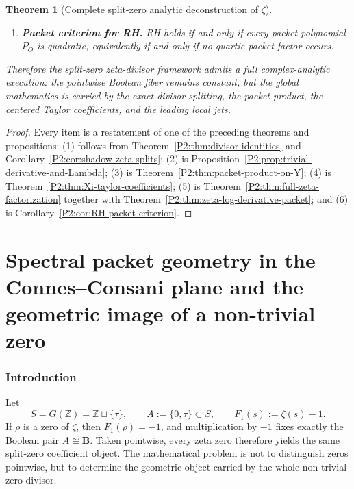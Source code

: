 \documentclass[11pt,a4paper]{article}
\numberwithin{equation}{section}
\newtheorem{theorem}{Theorem}[section]
\theoremstyle{definition}
\theoremstyle{remark}
\newcommand{\ZZ}{\mathbb Z}
\newcommand{\BB}{\mathbf B}
\newcommand{\taup}{\tau}
\newcommand{\setpartprefix}[1]{\def\partprefix{#1}\setcounter{section}{0}}
\def\partprefix{0}
\begin{document}
\begin{theorem}[Complete split-zero analytic deconstruction of $\zeta$]
\begin{enumerate}[label=(\arabic*)]
\item \textbf{Packet criterion for RH.}
RH holds if and only if every packet polynomial $P_O$ is quadratic, equivalently if and only if no quartic packet factor occurs.
\end{enumerate}

Therefore the split-zero zeta-divisor framework admits a full complex-analytic execution: the pointwise Boolean fiber remains constant, but the global mathematics is carried by the exact divisor splitting, the packet product, the centered Taylor coefficients, and the leading local jets.
\end{theorem}

\begin{proof}
Every item is a restatement of one of the preceding theorems and propositions:
(1) follows from Theorem~\ref{P2:thm:divisor-identities} and Corollary~\ref{P2:cor:shadow-zeta-splits};
(2) is Proposition~\ref{P2:prop:trivial-derivative-and-Lambda};
(3) is Theorem~\ref{P2:thm:packet-product-on-Y};
(4) is Theorem~\ref{P2:thm:Xi-taylor-coefficients};
(5) is Theorem~\ref{P2:thm:full-zeta-factorization} together with Theorem~\ref{P2:thm:zeta-log-derivative-packet}; and
(6) is Corollary~\ref{P2:cor:RH-packet-criterion}.
\end{proof}

\part{Spectral packet geometry in the Connes--Consani plane and the geometric image of a non-trivial zero}
\setpartprefix{III}

\section{Introduction}

Let
\[
S=G(\ZZ)=\ZZ\sqcup\{\taup\},
\qquad
A:=\{0,\taup\}\subset S,
\qquad
F_1(s):=\zeta(s)-1.
\]
If $\rho$ is a zero of $\zeta$, then $F_1(\rho)=-1$, and multiplication by $-1$ fixes exactly the Boolean pair $A\cong\BB$.  Taken pointwise, every zeta zero therefore yields the same split-zero coefficient object.  The mathematical problem is not to distinguish zeros pointwise, but to determine the geometric object carried by the whole non-trivial zero divisor.
\end{document}
